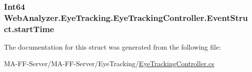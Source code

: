 \subsubsection[{start\+Time}]{\setlength{\rightskip}{0pt plus 5cm}Int64 Web\+Analyzer.\+Eye\+Tracking.\+Eye\+Tracking\+Controller.\+Event\+Struct.\+start\+Time}\label{struct_web_analyzer_1_1_eye_tracking_1_1_eye_tracking_controller_1_1_event_struct_ae43681b70dc05d38f8f6531dca8db700}


The documentation for this struct was generated from the following file\+:\begin{DoxyCompactItemize}
\item 
M\+A-\/\+F\+F-\/\+Server/\+M\+A-\/\+F\+F-\/\+Server/\+Eye\+Tracking/\hyperlink{_eye_tracking_controller_8cs}{Eye\+Tracking\+Controller.\+cs}\end{DoxyCompactItemize}
